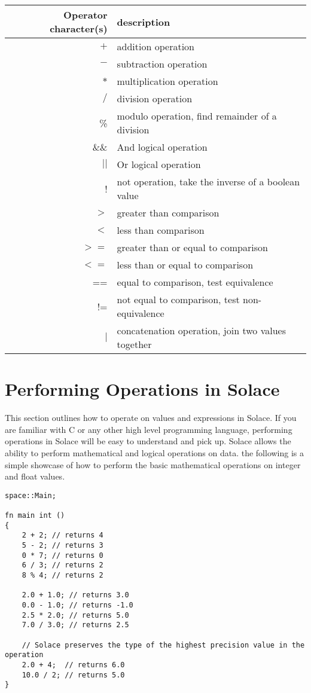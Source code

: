 \documentclass{article}
\begin{document}
\begin{center}
\begin{tabular}{|r|l|}
\hline
Operator character(s) & description \\
\hline
\hline
$+$ & addition operation \\
$-$ & subtraction operation \\
$*$ & multiplication operation \\
$/$ & division operation \\
\% & modulo operation, find remainder of a division \\
\hline
\hline
\&\& & And logical operation \\
$||$ & Or logical operation \\
! & not operation, take the inverse of a boolean value \\
\hline
$>$ & greater than comparison \\
$<$ & less than comparison \\
$>=$ & greater than or equal to comparison \\
$<=$ & less than or equal to comparison \\
== & equal to comparison, test equivalence \\
!= & not equal to comparison, test non-equivalence \\
\hline
\hline
$|$ & concatenation operation, join two values together \\
\hline
\end{tabular}
\end{center}


\section{Performing Operations in Solace}

This section outlines how to operate on values and expressions in Solace. If you are familiar with C or any other high level programming language, performing 
operations in Solace will be easy to understand and pick up. Solace allows the ability to perform mathematical and logical operations on data. the following is a
simple showcase of how to perform the basic mathematical operations on integer and float values.

\begin{lstlisting}
space::Main;

fn main int ()
{
	2 + 2; // returns 4
	5 - 2; // returns 3
	0 * 7; // returns 0
	6 / 3; // returns 2
	8 % 4; // returns 2

	2.0 + 1.0; // returns 3.0
	0.0 - 1.0; // returns -1.0
	2.5 * 2.0; // returns 5.0
	7.0 / 3.0; // returns 2.5

	// Solace preserves the type of the highest precision value in the operation
	2.0 + 4;  // returns 6.0
	10.0 / 2; // returns 5.0
}
\end{lstlisting}
\end{document}
